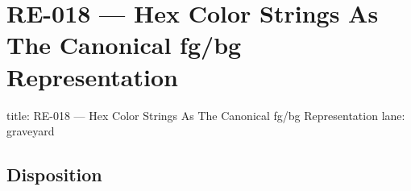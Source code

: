 \chapter{RE-018 --- Hex Color Strings As The Canonical fg/bg Representation}\label{record-367}

\smallskip

\begin{RecordMeta}
title: RE-018 — Hex Color Strings As The Canonical fg/bg Representation
lane: graveyard

\end{RecordMeta}

\section{Disposition}\label{record-367-disposition}

